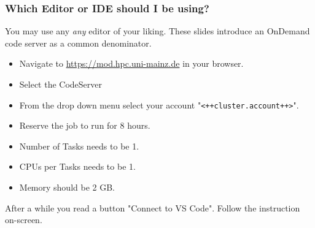 \begin{frame}[fragile]
  \frametitle{Which Editor or IDE should I be using?}
  \begin{hint}
     You may use any \emph{any} editor of your liking. These slides introduce an OnDemand code server as a common denominator.
  \end{hint}
  
  \begin{itemize}[<+->]
  	\item Navigate to \url{https://mod.hpc.uni-mainz.de} in your browser.
  	\item Select the CodeServer
  	\item From the drop down menu select your account "\verb,<++cluster.account++>,".
  	\item Reserve the job to run for 8 hours.
  	\item Number of Tasks needs to be 1.
  	\item CPUs per Tasks needs to be 1.
  	\item Memory should be 2 GB.
  \end{itemize}
  \pause
  \begin{hint}
  	After a while you read a button "Connect to VS Code". Follow the instruction on-screen.
  \end{hint}
\end{frame} 

